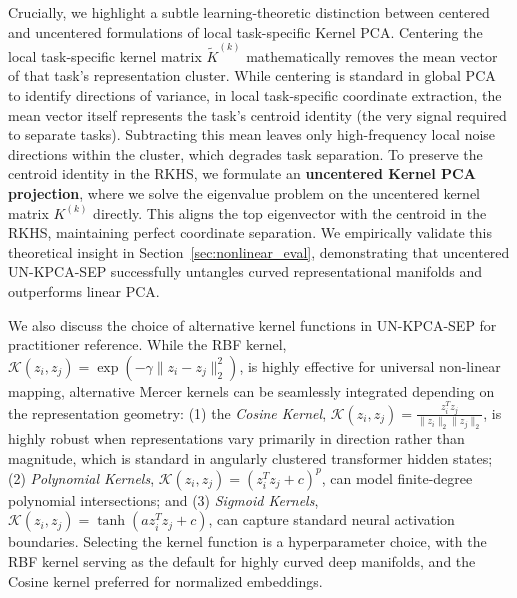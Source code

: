 Crucially, we highlight a subtle learning-theoretic distinction between centered and uncentered formulations of local task-specific Kernel PCA. Centering the local task-specific kernel matrix $\tilde{K}^{(k)}$ mathematically removes the mean vector of that task's representation cluster. While centering is standard in global PCA to identify directions of variance, in local task-specific coordinate extraction, the mean vector itself represents the task's centroid identity (the very signal required to separate tasks). Subtracting this mean leaves only high-frequency local noise directions within the cluster, which degrades task separation. To preserve the centroid identity in the RKHS, we formulate an \textbf{uncentered Kernel PCA projection}, where we solve the eigenvalue problem on the uncentered kernel matrix $K^{(k)}$ directly. This aligns the top eigenvector with the centroid in the RKHS, maintaining perfect coordinate separation. We empirically validate this theoretical insight in Section~\ref{sec:nonlinear_eval}, demonstrating that uncentered UN-KPCA-SEP successfully untangles curved representational manifolds and outperforms linear PCA.

We also discuss the choice of alternative kernel functions in UN-KPCA-SEP for practitioner reference. While the RBF kernel, $\mathcal{K}(z_i, z_j) = \exp(-\gamma \|z_i - z_j\|_2^2)$, is highly effective for universal non-linear mapping, alternative Mercer kernels can be seamlessly integrated depending on the representation geometry: (1) the \emph{Cosine Kernel}, $\mathcal{K}(z_i, z_j) = \frac{z_i^T z_j}{\|z_i\|_2 \|z_j\|_2}$, is highly robust when representations vary primarily in direction rather than magnitude, which is standard in angularly clustered transformer hidden states; (2) \emph{Polynomial Kernels}, $\mathcal{K}(z_i, z_j) = (z_i^T z_j + c)^p$, can model finite-degree polynomial intersections; and (3) \emph{Sigmoid Kernels}, $\mathcal{K}(z_i, z_j) = \tanh(a z_i^T z_j + c)$, can capture standard neural activation boundaries. Selecting the kernel function is a hyperparameter choice, with the RBF kernel serving as the default for highly curved deep manifolds, and the Cosine kernel preferred for normalized embeddings.

